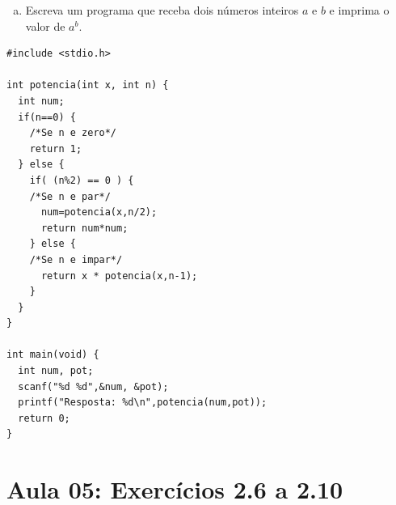 \documentclass[a4paper,10pt]{article}
\begin{document}
\begin{enumerate}
\begin{enumerate}[(a)]
\pagebreak

\item Escreva um programa que receba dois números inteiros $a$ e $b$ e imprima o valor de $a^b$.
  \end{enumerate}
  
\begin{lstlisting}
#include <stdio.h>

int potencia(int x, int n) {
  int num;
  if(n==0) {
    /*Se n e zero*/
    return 1;
  } else {
    if( (n%2) == 0 ) {
    /*Se n e par*/
      num=potencia(x,n/2);
      return num*num;
    } else {
    /*Se n e impar*/
      return x * potencia(x,n-1);
    }
  }
}

int main(void) {
  int num, pot;
  scanf("%d %d",&num, &pot);
  printf("Resposta: %d\n",potencia(num,pot));
  return 0;
}
\end{lstlisting}

\end{enumerate} %
\pagebreak



\newpage
\section{Aula 05: Exercícios 2.6 a 2.10}
\end{document}
